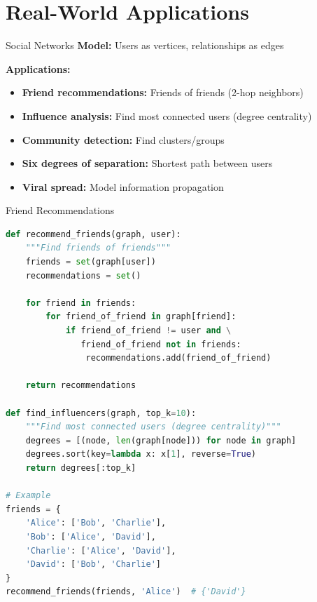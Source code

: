 \documentclass[aspectratio=169]{beamer}
\begin{document}
\section{Real-World Applications}

\begin{frame}{Social Networks}
  \textbf{Model:} Users as vertices, relationships as edges

  \vspace{0.3cm}
  \begin{center}
  \end{center}

  \vspace{0.3cm}
  \textbf{Applications:}
  \begin{itemize}
    \item \textbf{Friend recommendations:} Friends of friends (2-hop neighbors)
    \item \textbf{Influence analysis:} Find most connected users (degree centrality)
    \item \textbf{Community detection:} Find clusters/groups
    \item \textbf{Six degrees of separation:} Shortest path between users
    \item \textbf{Viral spread:} Model information propagation
  \end{itemize}
\end{frame}

\begin{frame}[fragile]{Friend Recommendations}
  \begin{lstlisting}[language=Python, basicstyle=\ttfamily\small]
def recommend_friends(graph, user):
    """Find friends of friends"""
    friends = set(graph[user])
    recommendations = set()

    for friend in friends:
        for friend_of_friend in graph[friend]:
            if friend_of_friend != user and \
               friend_of_friend not in friends:
                recommendations.add(friend_of_friend)

    return recommendations

def find_influencers(graph, top_k=10):
    """Find most connected users (degree centrality)"""
    degrees = [(node, len(graph[node])) for node in graph]
    degrees.sort(key=lambda x: x[1], reverse=True)
    return degrees[:top_k]

# Example
friends = {
    'Alice': ['Bob', 'Charlie'],
    'Bob': ['Alice', 'David'],
    'Charlie': ['Alice', 'David'],
    'David': ['Bob', 'Charlie']
}
recommend_friends(friends, 'Alice')  # {'David'}
  \end{lstlisting}
\end{frame}
\end{document}
